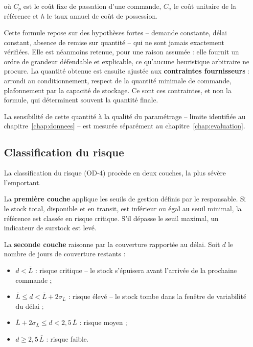 où $C_p$ est le coût fixe de passation d'une commande, $C_u$ le coût unitaire de la référence et $h$ le taux annuel de coût de possession.

Cette formule repose sur des hypothèses fortes -- demande constante, délai constant, absence de remise sur quantité -- qui ne sont jamais exactement vérifiées. Elle est néanmoins retenue, pour une raison assumée : elle fournit un ordre de grandeur défendable et explicable, ce qu'aucune heuristique arbitraire ne procure. La quantité obtenue est ensuite ajustée aux \textbf{contraintes fournisseurs} : arrondi au conditionnement, respect de la quantité minimale de commande, plafonnement par la capacité de stockage. Ce sont ces contraintes, et non la formule, qui déterminent souvent la quantité finale.

La sensibilité de cette quantité à la qualité du paramétrage -- limite identifiée au chapitre~\ref{chap:donnees} -- est mesurée séparément au chapitre~\ref{chap:evaluation}.

\subsection{Classification du risque}

La classification du risque (OD-4) procède en deux couches, la plus sévère l'emportant.

La \textbf{première couche} applique les seuils de gestion définis par le responsable. Si le stock total, disponible et en transit, est inférieur ou égal au seuil minimal, la référence est classée en risque critique. S'il dépasse le seuil maximal, un indicateur de surstock est levé.

La \textbf{seconde couche} raisonne par la couverture rapportée au délai. Soit $d$ le nombre de jours de couverture restants :

\begin{itemize}[label=--]
    \item $d < \overline{L}$ : risque critique -- le stock s'épuisera avant l'arrivée de la prochaine commande ;
    \item $\overline{L} \le d < \overline{L} + 2\sigma_L$ : risque élevé -- le stock tombe dans la fenêtre de variabilité du délai ;
    \item $\overline{L} + 2\sigma_L \le d < 2{,}5\,\overline{L}$ : risque moyen ;
    \item $d \ge 2{,}5\,\overline{L}$ : risque faible.
\end{itemize}

